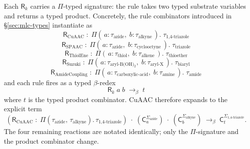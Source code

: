 Each $\mathsf{R}_{k}$ carries a $\Pi$-typed signature: the rule
takes two typed substrate variables and returns a typed product.
Concretely, the rule combinators introduced in
\S\ref{sec:mlc-types} instantiate as
\begin{equation}
  \label{eq:cuaac-typed}
  \mathsf{R}_{\text{CuAAC}}
    \;:\;
    \Pi(\,a : \tau_{\text{azide}},\;
        b : \tau_{\text{alkyne}}\,).\;
        \tau_{\text{1,4-triazole}}
\end{equation}
\begin{equation}
  \label{eq:spaac-typed}
  \mathsf{R}_{\text{SPAAC}}
    \;:\;
    \Pi(\,a : \tau_{\text{azide}},\;
        b : \tau_{\text{cyclooctyne}}\,).\;
        \tau_{\text{triazole}}
\end{equation}
\begin{equation}
  \label{eq:thiolene-typed}
  \mathsf{R}_{\text{ThiolEne}}
    \;:\;
    \Pi(\,a : \tau_{\text{thiol}},\;
        b : \tau_{\text{alkene}}\,).\;
        \tau_{\text{thioether}}
\end{equation}
\begin{equation}
  \label{eq:suzuki-typed}
  \mathsf{R}_{\text{Suzuki}}
    \;:\;
    \Pi(\,a : \tau_{\text{aryl-B(OH)$_2$}},\;
        b : \tau_{\text{aryl-X}}\,).\;
        \tau_{\text{biaryl}}
\end{equation}
\begin{equation}
  \label{eq:amide-typed}
  \mathsf{R}_{\text{AmideCoupling}}
    \;:\;
    \Pi(\,a : \tau_{\text{carboxylic-acid}},\;
        b : \tau_{\text{amine}}\,).\;
        \tau_{\text{amide}}
\end{equation}
and each rule fires as a typed $\beta$-redex
\begin{equation}
  \label{eq:click-redex}
  \mathsf{R}_{k}\;a\;b
    \;\longrightarrow_{\beta}\;
    t
\end{equation}
where $t$ is the typed product combinator. CuAAC therefore
expands to the explicit term
\begin{equation}
  \label{eq:cuaac-reduction}
  (\mathsf{R}_{\text{CuAAC}}
   \;:\;
   \Pi(\tau_{\text{azide}},\, \tau_{\text{alkyne}})
     .\, \tau_{\text{1,4-triazole}})
   \;\cdot\;
   (\mathsf{C}_{a}^{\Sigma_{\text{azide}}})
   \;\cdot\;
   (\mathsf{C}_{b}^{\Sigma_{\text{alkyne}}})
   \;\longrightarrow_{\beta}\;
   \mathsf{C}_{t}^{\Sigma_{\text{1,4-triazole}}}.
\end{equation}
The four remaining reactions are notated identically; only the
$\Pi$-signature and the product combinator change.

